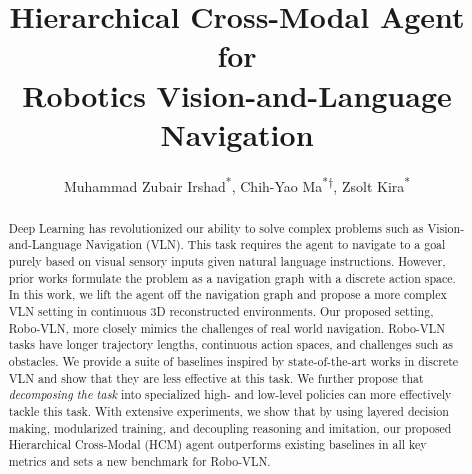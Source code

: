 \documentclass[letter, 10pt, conference]{ieeeconf}
\begin{document}
\title{\LARGE \bf Hierarchical Cross-Modal Agent for \\Robotics Vision-and-Language Navigation}
\author{Muhammad Zubair Irshad\textsuperscript{*}, Chih-Yao Ma\textsuperscript{*}\textsuperscript{$\dagger$}, Zsolt Kira\textsuperscript{*}
}



\begin{comment}
Recently proposed navigation graph based discrete VLN settings become a poor proxy for real-world robotics navigation.
\end{comment}
  

\begin{abstract}
Deep Learning has revolutionized our ability to solve complex problems such as Vision-and-Language Navigation (VLN). This task requires the agent to navigate to a goal purely based on visual sensory inputs given natural language instructions. However, prior works formulate the problem as a navigation graph with a discrete action space. In this work, we lift the agent off the navigation graph and propose a more complex VLN setting in continuous 3D reconstructed environments. Our proposed setting, Robo-VLN, more closely mimics the challenges of real world navigation. Robo-VLN tasks have longer trajectory lengths, continuous action spaces, and challenges such as obstacles. We provide a suite of baselines inspired by state-of-the-art works in discrete VLN and show that they are less effective at this task. We further propose that \textit{decomposing the task} into specialized high- and low-level policies can more effectively tackle this task. With extensive experiments, we show that by using layered decision making, modularized training, and decoupling reasoning and imitation, our proposed Hierarchical Cross-Modal (HCM) agent outperforms existing baselines in all key metrics and sets a new benchmark for Robo-VLN.
\end{abstract}
\end{document}
